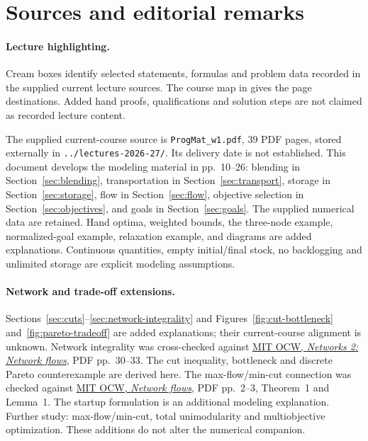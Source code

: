 \documentclass[11pt,a4paper]{article}
\begin{document}
\section{Sources and editorial remarks}\label{sec:sources}
\paragraph{Lecture highlighting.}
Cream boxes identify selected statements, formulas and problem data recorded in
the supplied current lecture sources. The course map in
 gives the page destinations. Added hand proofs,
qualifications and solution steps are not claimed as recorded lecture content.

The supplied current-course source is \texttt{ProgMat\_w1.pdf}, 39 PDF pages,
stored externally in \texttt{../lectures-2026-27/}. Its delivery date is not
established. This document develops the modeling material in pp.~10--26:
blending in Section~\ref{sec:blending}, transportation in Section~\ref{sec:transport},
storage in Section~\ref{sec:storage}, flow in Section~\ref{sec:flow}, objective
selection in Section~\ref{sec:objectives}, and goals in Section~\ref{sec:goals}.
The supplied numerical data are retained. Hand optima, weighted bounds, the
three-node example, normalized-goal example, relaxation example, and diagrams
are added explanations. Continuous quantities, empty initial/final stock, no
backlogging and unlimited storage are explicit modeling assumptions.

\paragraph{Network and trade-off extensions.}
Sections~\ref{sec:cuts}--\ref{sec:network-integrality} and
Figures~\ref{fig:cut-bottleneck} and~\ref{fig:pareto-tradeoff} are added
explanations; their current-course alignment is unknown. Network integrality
was cross-checked against
\href{https://ocw.mit.edu/courses/15-053-optimization-methods-in-management-science-spring-2013/687225c151d8cc8254dcb8b07e5f9ce2_MIT15_053S13_lec16.pdf}{MIT OCW,
  \emph{Networks 2: Network flows}}, PDF pp.~30--33.
The cut inequality, bottleneck and discrete Pareto counterexample are derived
here. The max-flow/min-cut connection was checked against
\href{https://ocw.mit.edu/courses/18-310-principles-of-discrete-applied-mathematics-fall-2013/3235079dd74eb61e56f41ea2bb595d64_MIT18_310F13_Ch9.pdf}{MIT OCW,
  \emph{Network flows}}, PDF pp.~2--3, Theorem~1 and Lemma~1.
The startup formulation is an additional modeling explanation.
Further study: max-flow/min-cut, total unimodularity and multiobjective
optimization. These additions do not alter the numerical companion.
\end{document}
